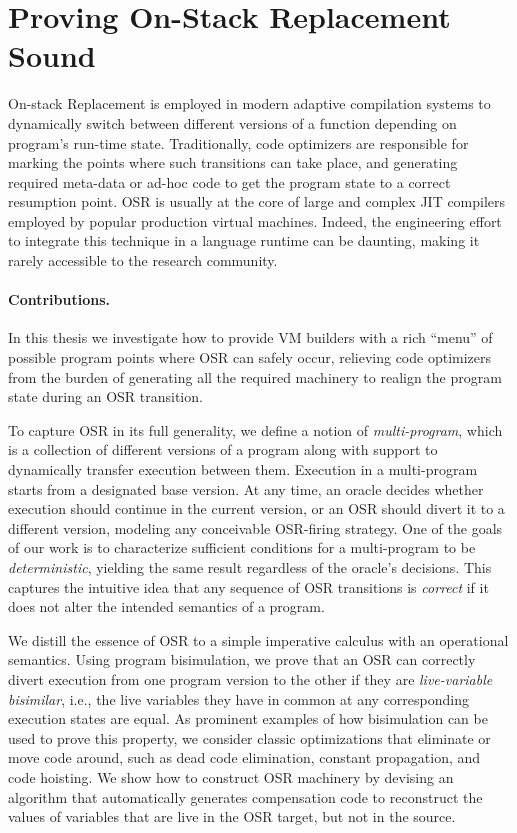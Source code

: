 \section{Proving On-Stack Replacement Sound}
\label{se:osr-a-la-carte}

On-stack Replacement is employed in modern adaptive compilation systems to dynamically switch between different versions of a function depending on program's run-time state. Traditionally, code optimizers are responsible for marking the points where such transitions can take place, and generating required meta-data or ad-hoc code to get the program state to a correct resumption point. OSR is usually at the core of large and complex JIT compilers employed by popular production virtual machines. Indeed, the engineering effort to integrate this technique in a language runtime can be daunting, making it rarely accessible to the research community.

\paragraph*{Contributions.} In this thesis we investigate how to provide VM builders with a rich ``menu'' of possible program points where OSR can safely occur, relieving code optimizers from the burden of generating all the required machinery to realign the program state during an OSR transition.

To capture OSR in its full generality, we define a notion of {\em multi-program}, which is a collection of different versions of a program along with support to dynamically transfer execution between them. Execution in a multi-program starts from a designated base version. At any time, an oracle decides whether execution should continue in the current version, or an OSR should divert it to a different version, modeling any conceivable OSR-firing strategy. One of the goals of our work is to characterize sufficient conditions for a multi-program to be {\em deterministic}, yielding the same result regardless of the oracle's decisions. This captures the intuitive idea that any sequence of OSR transitions is {\em correct} if it does not alter the intended semantics of a program.

We distill the essence of OSR to a simple imperative calculus with an operational semantics. Using program bisimulation, we prove that an OSR can correctly divert execution from one program version to the other if they are {\em live-variable bisimilar}, i.e., the live variables they have in common at any corresponding execution states are equal. As prominent examples of how bisimulation can be used to prove this property, we consider classic optimizations that eliminate or move code around, such as dead code elimination, constant propagation, and code hoisting. We show how to construct OSR machinery by devising an algorithm that automatically generates compensation code to reconstruct the values of variables that are live in the OSR target, but not in the source.

